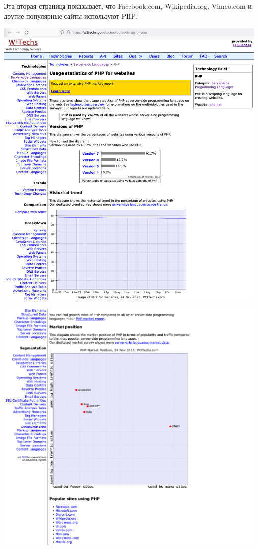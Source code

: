 
Эта вторая страница показывает, что Facebook.com, Wikipedia.org, Vimeo.com и другие популярные сайты используют PHP.

\begin{center}
    \includegraphics[width=40em]{php-websites-p1}
\end{center}
\WillContinue
\pagebreak

\Continuing
\begin{center}
    \includegraphics[width=40em]{php-websites-p2}
\end{center}

\pagebreak
